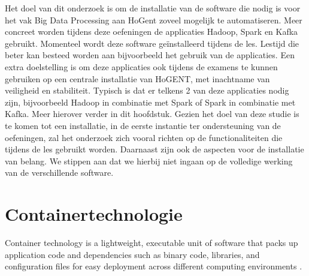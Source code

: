 Het doel van dit onderzoek is om de  installatie van de software die nodig is voor het vak Big Data Processing aan HoGent zoveel mogelijk te automatiseren.
Meer concreet worden tijdens deze oefeningen de applicaties Hadoop, Spark en Kafka gebruikt. Momenteel wordt deze software geïnstalleerd tijdens de les. Lestijd die beter kan besteed worden aan bijvoorbeeld het gebruik van de applicaties.
\newline
\newline
Een extra doelstelling is om deze applicaties ook tijdens de examens te kunnen gebruiken op een centrale installatie van HoGENT, met inachtname van veiligheid en stabiliteit.
\newline
\newline
Typisch is dat er telkens 2 van deze applicaties nodig zijn, bijvoorbeeld Hadoop in combinatie met Spark of Spark in combinatie met Kafka. Meer hierover verder in dit hoofdstuk.
\newline
\newline
Gezien het doel van deze studie is te komen tot een installatie, in de eerste instantie ter ondersteuning van de oefeningen, zal het onderzoek zich vooral richten op de functionaliteiten die tijdens de les gebruikt worden. Daarnaast zijn ook de aspecten voor de installatie van belang. We stippen aan dat we hierbij niet ingaan op de volledige werking van de verschillende software.
\newline
\newline

\section{Containertechnologie}
Container technology is a lightweight, executable unit of software that packs up application code and dependencies such as binary code, libraries, and configuration files for easy deployment across different computing environments \autocite{Solarwinds2023}.

